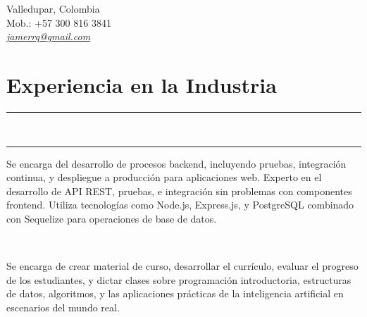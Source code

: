 \documentclass[]{rahulworld-resume}
\begin{document}
\hfill
\begin{minipage}[t]{0.66\textwidth}
    \hspace*{0pt}\hfill    \\
    \hspace*{0pt}\hfill    \\
    \hspace*{0pt}\hfill Valledupar, Colombia\\
    \hspace*{0pt}\hfill Mob.: +57 300 816 3841 \\
    \hspace*{0pt}\hfill
    \textit{\href{mailto:jamerrq@gmail.com}{jamerrq@gmail.com}}
    \section{Experiencia en la Industria}
    \noindent\rule{12.5cm}{0.4pt} \\
    \noindent\rule{12.5cm}{0.4pt}

    \noindent
    \hspace{5em}%
    \begin{minipage}{0.85\textwidth\vspace{2pt}}
        Se encarga del desarrollo de procesos backend, incluyendo pruebas, integración continua, y despliegue a producción para aplicaciones web. Experto en el desarrollo de API REST, pruebas, e integración sin problemas con componentes frontend. Utiliza tecnologías como Node.js, Express.js, y PostgreSQL combinado con Sequelize para operaciones de base de datos.
    \end{minipage}

    \\
    \noindent
    \hspace{5em}%
    \begin{minipage}{0.85\textwidth\vspace{2pt}}
        Se encarga de crear material de curso, desarrollar el currículo, evaluar el progreso de los estudiantes, y dictar clases sobre programación introductoria, estructuras de datos, algoritmos, y las aplicaciones prácticas de la inteligencia artificial en escenarios del mundo real.
    \end{minipage}


\end{minipage}
\end{document}
